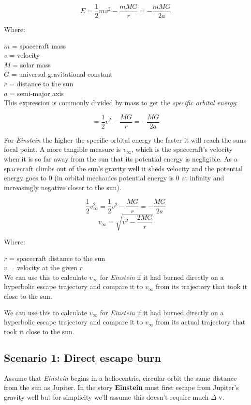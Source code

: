 \documentclass[12pt]{article} %
\begin{document}
$$ E = \frac{1}{2} mv^2 - \frac{mMG}{r} = -\frac{mMG}{2a}$$

Where:

$m$ = spacecraft mass \\
$v$ = velocity \\
$M$ = solar mass\\
$G$ = universal gravitational constant\\
$r$ = distance to the sun\\
$a$ = semi-major axis\\

This expression is commonly divided by mass to get the \textit{specific orbital energy}:

$$ = \frac{1}{2} v^2 - \frac{MG}{r} = -\frac{MG}{2a}$$

For \textit{Einstein} the higher the specific orbital energy the faster it will reach the suns focal point. A more tangible measure is $v_{\infty}$, which is the spacecraft's velocity when it is so far away from the sun that its potential energy is negligible. As a spacecraft climbs out of the sun's gravity well it sheds velocity and the potential energy goes to 0 (in orbital mechanics potential energy is 0 at infinity and increasingly negative closer to the sun).

$$\frac{1}{2}v_{\infty}^{2} = \frac{1}{2} v^2 - \frac{MG}{r} = -\frac{MG}{2a}$$
$$v_{\infty} = \sqrt{v^2-\frac{2MG}{r}}$$

Where:

$r$ = spacecraft distance to the sun\\
$v$ = velocity at the given $r$\\

We can use this to calculate $v_{\infty}$ for \textit{Einstein} if it had burned directly on a hyperbolic escape trajectory and compare it to $v_{\infty}$ from its trajectory that took it close to the sun.

We can use this to calculate $v_{\infty}$ for \textit{Einstein} if it had burned directly on a hyperbolic escape trajectory and compare it to $v_{\infty}$ from its actual trajectory that took it close to the sun.

\subsection{Scenario 1: Direct escape burn}

Assume that \textit{Einstein} begins in a heliocentric, circular orbit the same distance from the sun as Jupiter. In the story \textbf{Einstein} must first escape from Jupiter's gravity well but for simplicity we'll assume this doesn't require much $\Delta$ v.
\end{document}
